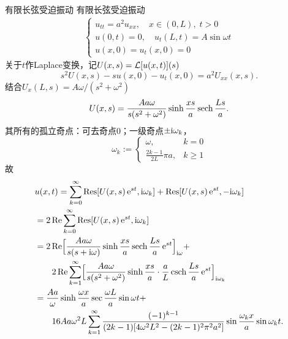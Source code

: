\begin{example}{有限长弦受迫振动}{}
	有限长弦受迫振动
	\begin{align*}
		\begin{cases}
			u_{tt} = a^2u_{xx},\quad x \in (0,L),\;t > 0\\
			u(0,t) = 0,\quad u_t(L,t) = A\sin\omega t\\
			u(x,0) = u_t(x,0) = 0
		\end{cases}
	\end{align*}
	关于$t$作Laplace变换，记$U(x,s) = \operatorname{\mathcal L}[u(x,t)](s)$
	\[
		s^2U(x,s) - s u(x,0) - u_t(x,0) = a^2U_{xx}(x,s).
	\]
	结合$U_x(L,s) = A\omega/(s^2 + \omega^2)$
	\[
		U(x,s) = \frac{Aa\omega}{s(s^2 + \omega^2)}\sinh\frac{xs}a\operatorname{sech}\frac{Ls}a.
	\]
	其所有的孤立奇点：可去奇点0；一级奇点$\pm\mathrm{i}\omega_k$，
	\[
		\omega_k :=
		\begin{cases}
			\omega,&k = 0\\
			\frac{2k - 1}{2L}\pi a,&k \geqslant 1
		\end{cases}
	\]
	故
	\begin{align}
		&u(x,t) = \sum_{k=0}^\infty\operatorname{Res}[U(x,s)\mathop{}\!\mathrm{e}^{st},\mathrm{i}\omega_k] + \operatorname{Res}[U(x,s)\mathop{}\!\mathrm{e}^{st},-\mathrm{i}\omega_k]\notag\\
		&= 2\operatorname{Re}\sum_{k=0}^\infty\operatorname{Res}[U(x,s)\mathop{}\!\mathrm{e}^{st},\mathrm{i}\omega_k]\notag\\
		&= 2\operatorname{Re}\Bigl[\frac{Aa\omega}{s(s + \mathrm{i}\omega)}\sinh\frac{xs}a\operatorname{sech}\frac{Ls}a\mathop{}\!\mathrm{e}^{st}\Bigr]_{\mathrm{i}\omega} +\notag\\
		&\qquad 2\operatorname{Re}\sum_{k=1}^\infty\Bigl[\frac{Aa\omega}{s(s^2 + \omega^2)}\sinh\frac{xs}a \cdot \frac aL\operatorname{csch}\frac{Ls}a\mathop{}\!\mathrm{e}^{st}\Bigr]_{\mathrm{i}\omega_k}\notag\\
		&= \frac{Aa}\omega\sinh\frac{\omega x}a\sec\frac{\omega L}a\sin\omega t +\notag\\
		&\qquad 16Aa\omega^2L\sum_{k=1}^\infty\frac{(-1)^{k-1}}{(2k - 1)[4\omega^2L^2 - (2k - 1)^2\pi^2a^2]}\sin\frac{\omega_kx}a\sin\omega_kt.\label{eq:mmp-driven-string-solution}
	\end{align}
\end{example}

